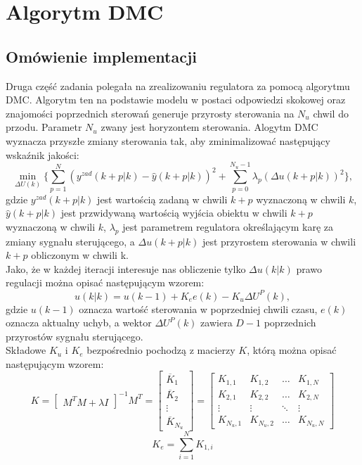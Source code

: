\documentclass[a4paper, 10pt]{article}
\begin{document}
\section{Algorytm DMC}

\subsection{Omówienie implementacji}
Druga część zadania polegała na zrealizowaniu regulatora za pomocą algorytmu DMC. Algorytm ten na podstawie modelu w postaci odpowiedzi skokowej oraz znajomości poprzednich sterowań generuje przyrosty sterowania na $N_{u}$ chwil do przodu. Parametr $N_{u}$ zwany jest horyzontem sterowania. Alogytm DMC wyznacza przyszłe zmiany sterowania tak, aby zminimalizować następujący wskaźnik jakości:
\[\min\limits_{\Delta U(k)} \{\sum_{p=1}^{N}(y^{zad}(k+p|k)-\widehat{y}(k+p|k))^2+\sum_{p=0}^{N_{u}-1}\lambda_{p}(\Delta u(k+p|k))^2 \} ,\]				
gdzie $y^{zad}(k+p|k)$ jest wartością zadaną w chwili $k+p$ wyznaczoną w chwili $k$, $\widehat{y}(k+p|k)$ jest przwidywaną wartością wyjścia obiektu w chwili $k+p$ wyznaczoną w chwili $k$, $\lambda_{p}$ jest parametrem regulatora określającym karę za zmiany sygnału sterującego, a $\Delta u(k+p|k)$ jest przyrostem sterowania w chwili $k+p$ obliczonym w chwili k. \\
Jako, że w każdej iteracji interesuje nas obliczenie tylko $\Delta u(k|k)$ prawo regulacji można opisać następującym wzorem:
\[u(k|k)=u(k-1)+K_{e}e(k)-K_{u}\Delta U^{P}(k),\]
gdzie $u(k-1)$ oznacza wartość sterowania w poprzedniej chwili czasu, $e(k)$ oznacza aktualny uchyb, a wektor $\Delta U^{P}(k)$ zawiera $D-1$ poprzednich przyrostów sygnału sterującego.\\
Składowe $K_{u}$ i $K_{e}$ bezpośrednio pochodzą z macierzy $K$, którą można opisać następującym wzorem:
\[K = 
\begin{bmatrix}
M^{T}M+\lambda I 
\end{bmatrix} ^{-1}M^{T} = 
\begin{bmatrix}
\overline{K}_1 \\\overline{K}_2 \\ \vdots\\ \overline{K}_{N_{u}}
\end{bmatrix} = 
\begin{bmatrix}
K_{1,1} & K_{1,2} & \dots & K_{1,N} \\
K_{2,1} & K_{2,2}  & \dots & K_{2,N} \\
\vdots  & \vdots &\ddots  &\vdots \\
K_{N_{u},1}   & K_{N_{u},2}  &\dots  & K_{N_{u},N}
\end{bmatrix}
\]
\[K_e = \sum_{i=1}^{N}K_{1,i} \]
\end{document}

